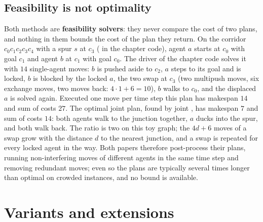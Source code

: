 \subsection{Feasibility is not optimality}
\label{sec:ch11-quality}

Both methods are \textbf{feasibility solvers}: they
never compare the cost of two plans, and nothing in them bounds the cost of
the plan they return. On the corridor $c_0 c_1 c_2 c_3 c_4$ with a spur $s$
at $c_3$ ( in the chapter code), agent $a$ starts at
$c_0$ with goal $c_1$ and agent $b$ at $c_1$ with goal $c_0$. The driver of
the chapter code solves it with $14$ single-agent moves: $b$ is pushed
aside to $c_2$, $a$ steps to its goal and is locked, $b$ is blocked by the
locked $a$, the two swap at $c_3$ (two multipush moves, six exchange moves,
two moves back: $4 \cdot 1 + 6 = 10$), $b$ walks to $c_0$, and the
displaced $a$ is solved again. Executed one move per time step this plan
has makespan $14$ and sum of costs $27$. The optimal joint plan, found by
joint \astar, has makespan $7$ and sum of costs $14$: both agents walk to
the junction together, $a$ ducks into the spur, and both walk back. The
ratio is two on this toy graph; the $4d + 6$ moves of a swap grow with the
distance $d$ to the nearest junction, and a swap is repeated for every
locked agent in the way. Both papers therefore post-process their plans,
running non-interfering moves of different agents in the same time step
and removing redundant moves; even so the plans are typically several times
longer than optimal on crowded instances, and no bound is available.
\FloatBarrier

\section{Variants and extensions}
\label{sec:ch11-variants}

